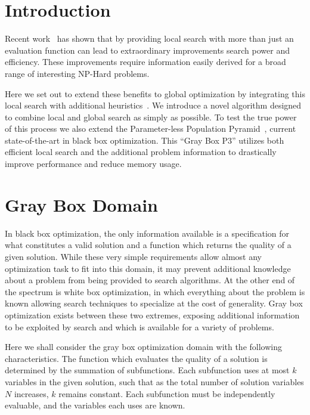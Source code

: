 \documentclass{sig-alternate}
\begin{document}
\section{Introduction}

Recent work~\cite{whitley:2013:greedy,chicano:2014:ball} has shown that by
providing local search with more than just an evaluation function can lead
to extraordinary improvements search power and efficiency. These improvements
require information easily derived for a broad range of interesting NP-Hard
problems.

Here we set out to extend these benefits to global optimization by integrating
this local search with additional heuristics~\cite{chen:2011:memetic}.
We introduce a novel algorithm designed to combine local
and global search as simply as possible. To test the true power of this
process we also extend the Parameter-less Population Pyramid~\cite{goldman:2014:p3},
current state-of-the-art in black box optimization. This ``Gray Box P3''
utilizes both efficient local search and the additional problem information
to drastically improve performance and reduce memory usage.

\section{Gray Box Domain}
\label{sec-gray-box}
In black box optimization, the only information available is a specification
for what constitutes a valid solution and a function which returns the quality
of a given solution. While these very simple requirements allow almost any
optimization task to fit into this domain, it may prevent additional knowledge
about a problem from being provided to search algorithms. At the other end of
the spectrum is white box optimization, in which everything about the problem
is known allowing search techniques to specialize at the cost of generality.
Gray box optimization exists between these two extremes, exposing additional
information to be exploited by search and which is available for a variety of problems.

Here we shall consider the gray box optimization domain with the following
characteristics. The function which evaluates the quality of a solution is determined by the summation
of subfunctions. Each subfunction uses at most $k$ variables in the given solution,
such that as the total number of solution variables $N$ increases, $k$ remains constant.
Each subfunction must be independently evaluable, and the variables each uses are known.
\end{document}
